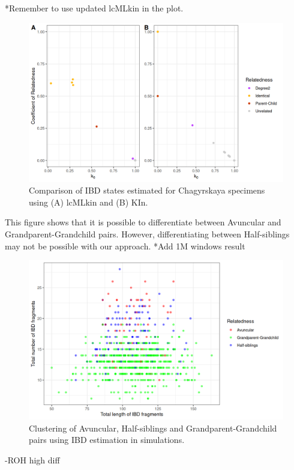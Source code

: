 \documentclass[12pt, letterpaper]{article}
\begin{document}
*Remember to use updated lcMLkin in the plot.
\begin{figure}[htp]
    \centering
    \includegraphics[width=18cm]{supplementary_info/plots/lcPlot.png}
    \caption{Comparison of IBD states estimated for Chagyrskaya specimens using (A) lcMLkin and (B) KIn.}
    \label{figS4}
\end{figure}

This figure shows that it is possible to differentiate between Avuncular and Grandparent-Grandchild pairs.
However, differentiating between Half-siblings may not be possible with our approach. 
*Add 1M windows result
\begin{figure}[htp]
    \centering
    \includegraphics[width=18cm]{supplementary_info/plots/degree2_10Mwin.png}
    \caption{Clustering of Avuncular, Half-siblings and Grandparent-Grandchild pairs using IBD estimation in simulations.}
    \label{figS5}
\end{figure}

-ROH high diff
\end{document}
